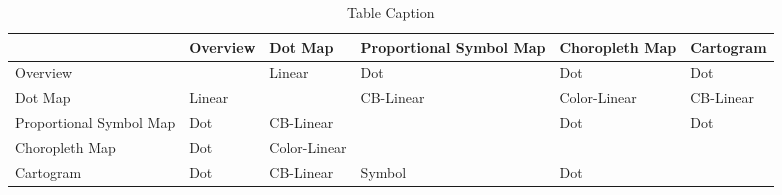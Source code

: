 \begin{table}[!htp]
    \begin{tabular}{M{22mm}||M{22mm} M{22mm} M{22mm} M{22mm} M{22mm}}

    ~                       & Overview & Dot Map & Proportional Symbol Map & Choropleth Map & Cartogram \\[4ex] \hline \hline

    Overview                & ~        & Linear       & Dot                       & Dot              & Dot         \\[4ex]

    Dot Map                 & Linear        & ~       & CB-Linear                       & Color-Linear              & CB-Linear         \\[4ex]

    Proportional Symbol Map & Dot        & CB-Linear       & ~                       & Dot              & Dot         \\[4ex]

    Choropleth Map          & Dot        & Color-Linear       & ~                       & ~              & ~         \\[4ex]

    Cartogram               & Dot        & CB-Linear       & Symbol                       & Dot              & ~         \\[4ex]
    \end{tabular}
    \caption {Table Caption}
\end{table}









